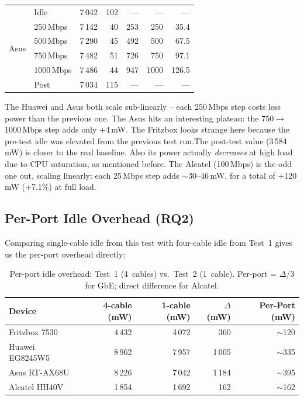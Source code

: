 \begin{table}[H]
\begin{tabular}{l l r r r r r}
        \multirow{6}{*}{Asus}
            & Idle           & 7\,042 & 102 & ---   & ---   & ---  \\
            & 250\,Mbps      & 7\,142 & 40  & 253   & 250   & 35.4 \\
            & 500\,Mbps      & 7\,290 & 45  & 492   & 500   & 67.5 \\
            & 750\,Mbps      & 7\,482 & 51  & 726   & 750   & 97.1 \\
            & 1000\,Mbps     & 7\,486 & 44  & 947   & 1000  & 126.5 \\
            & Post           & 7\,034 & 115 & ---   & ---   & ---  \\
        \bottomrule
    \end{tabular}
\end{table}

The Huawei and Asus both scale sub-linearly -- each 250\,Mbps step costs less power than the previous one.
The Asus hits an interesting plateau: the 750$\to$1000\,Mbps step adds only +4\,mW.
The Fritzbox looks strange here because the pre-test idle was elevated from the previous test run.The post-test value (3\,584\,mW) is closer to the real baseline. Also its power actually \emph{decreases} at high load due to \ac{CPU} saturation, as mentioned before.
The Alcatel (100\,Mbps) is the odd one out, scaling linearly: each 25\,Mbps step adds $\sim$30--46\,mW, for a total of +120\,mW (+7.1\%) at full load.

\subsection{Per-Port Idle Overhead (RQ2)}
\label{sec:test2-port-overhead}

Comparing single-cable idle from this test with four-cable idle from Test~1 gives us the per-port overhead directly:

\begin{table}[H]
    \centering
    \caption{Per-port idle overhead: Test~1 (4~cables) vs.\ Test~2 (1~cable). Per-port = $\Delta / 3$ for \ac{GbE}; direct difference for Alcatel.}
    \label{tab:test2_port_overhead}
    \small\renewcommand{\arraystretch}{0.88}
    \begin{tabular}{l r r r r}
        \toprule
        \textbf{Device} & \textbf{4-cable (mW)} & \textbf{1-cable (mW)} & \textbf{$\Delta$ (mW)} & \textbf{Per-Port (mW)} \\
        \midrule
        Fritzbox 7530        & 4\,432 & 4\,072 & 360  & $\sim$120 \\
        Huawei EG8245W5      & 8\,962 & 7\,957 & 1\,005 & $\sim$335 \\
        Asus RT-AX68U        & 8\,226 & 7\,042 & 1\,184 & $\sim$395 \\
        Alcatel HH40V        & 1\,854 & 1\,692 & 162  & $\sim$162 \\
        \bottomrule
    \end{tabular}
\end{table}

